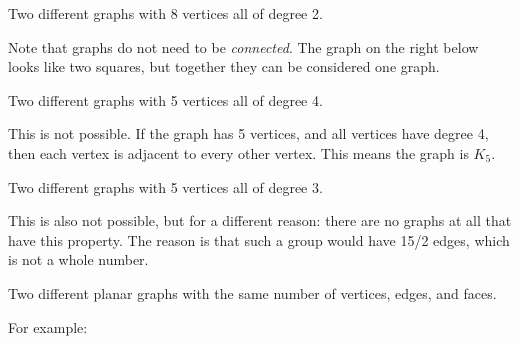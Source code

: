 \documentclass[10pt]{exam}
\def\r{2.5pt}
\def\v{circle (\r)}
\begin{document}
\begin{questions}
\begin{solution}
\begin{center}
\end{center}
\end{solution}
\vfill
\question Two different graphs with 8 vertices all of degree 2.

\begin{solution} Note that graphs do not need to be \emph{connected}.  The graph on the right below looks like two squares, but together they can be considered one graph.

\begin{center}
\hspace{.3\textwidth}
\end{center}
\end{solution}
\vfill
\question Two different graphs with 5 vertices all of degree 4.
\begin{solution}
This is not possible.  If the graph has 5 vertices, and all vertices have degree 4, then each vertex is adjacent to every other vertex.  This means the graph is $K_5$.
\end{solution}
\vfill
\question Two different graphs with 5 vertices all of degree 3.
\begin{solution}
This is also not possible, but for a different reason: there are no graphs at all that have this property.  The reason is that such a group would have 15/2 edges, which is not a whole number.
\end{solution}
\vfill
{}
\question Two different planar graphs with the same number of vertices, edges, and faces.

\begin{solution} For example:


\end{solution}
\end{questions}
\end{document}
